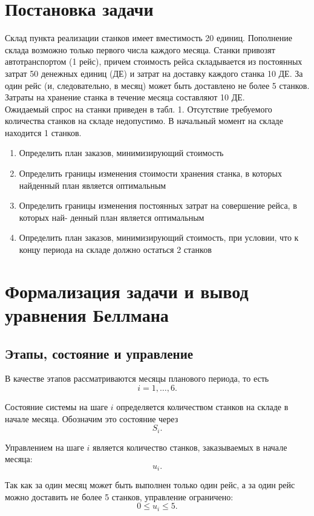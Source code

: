 \documentclass[a4paper,12pt]{article}
\begin{document}
\section{Постановка задачи}
Склад пункта реализации станков имеет вместимость 20 единиц. Пополнение склада возможно только первого числа каждого месяца.
Станки привозят автотранспортом (1 рейс), причем стоимость рейса складывается из постоянных затрат 50 денежных единиц (ДЕ)
и затрат на доставку каждого станка 10 ДЕ. За один рейс (и, следовательно, в месяц) может быть доставлено не более 5 станков.
\\
Затраты на хранение станка в течение месяца составляют 10 ДЕ.
\\
Ожидаемый спрос на станки приведен в табл. 1. Отсутствие требуемого количества станков на складе недопустимо.
В начальный момент на складе находится 1 станков.
\begin{enumerate}
	\item Определить план заказов, минимизирующий стоимость
	\item Определить границы изменения стоимости хранения станка, в которых найденный план является оптимальным
	\item Определить границы изменения постоянных затрат на совершение рейса, в которых най-
денный план является оптимальным
	\item Определить план заказов, минимизирующий стоимость, при условии, что к концу периода
на складе должно остаться 2 станков
\end{enumerate}
\section{Формализация задачи и вывод уравнения Беллмана}

\subsection{Этапы, состояние и управление}
В качестве этапов рассматриваются месяцы планового периода, то есть
\[
i = 1,\dots,6.
\]

Состояние системы на шаге $i$ определяется количеством станков на складе в начале месяца. Обозначим это состояние через
\[
S_i.
\]

Управлением на шаге $i$ является количество станков, заказываемых в начале месяца:
\[
u_i.
\]

Так как за один месяц может быть выполнен только один рейс, а за один рейс можно доставить не более 5 станков, управление ограничено:
\[
0 \le u_i \le 5.
\]
\end{document}
